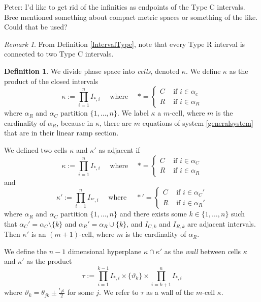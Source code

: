 \documentclass[12pt]{article}
\theoremstyle{definition}
\newtheorem{defn}{Definition}[section]
\theoremstyle{remark}
\newtheorem{remark}{Remark}[section]
\begin{document}
{\color{cyan} Peter: I'd like to get rid of the infinities as endpoints of the Type C intervals. Bree mentioned something about compact metric spaces or something of the like. Could that be used?}

\begin{remark}
From Definition \ref{IntervalType}, note that every Type R interval is connected to two Type C intervals.
\end{remark}

\begin{defn} \label{kappa}
 We divide phase space into \textit{cells}, denoted $\kappa$. We define $\kappa$ as the product of the closed intervals
 \begin{equation}	\label{kappadefn}
 \kappa:=\prod_{i=1}^n I_{*,i} \quad \text{ where } \quad *=
 \begin{cases} 
 C & \text { if } i\in\alpha_c \\
 R & \text{ if } i \in \alpha_R
 \end{cases}
 \end{equation}
 where $\alpha_R$ and $\alpha_C$ partition $\{1,\dots,n\}$. We label $\kappa$ a  $m$-cell, where $m$ is the cardinality of $\alpha_R$, because in $\kappa$, there are $m$ equations of system \eqref{generalsystem} that are in their linear ramp section.

We defined two cells $\kappa$ and $\kappa'$ as adjacent if 
\begin{equation*}
\kappa:=\prod_{i=1}^n I_{*,i} \quad \text{ where } \quad *=
 \begin{cases} 
 C & \text { if } i\in\alpha_C \\
 R & \text{ if } i \in \alpha_R
 \end{cases}
 \end{equation*}
 and 
 \begin{equation*}
\kappa':=\prod_{i=1}^n I_{*',i} \quad \text{ where } \quad *'=
 \begin{cases} 
 C & \text { if } i\in\alpha_C' \\
 R & \text{ if } i \in \alpha_R'
 \end{cases}
 \end{equation*}
 where $\alpha_R$ and $\alpha_C$ partition $\{1,\dots,n\}$ and there exists some $k\in \{1,\dots,n\}$ such that $\alpha_C'=\alpha_C\setminus \{k\}$ and $\alpha_R'=\alpha_R\cup \{k\}$, and $I_{C,k}$ and $I_{R,k}$ are adjacent intervals. Then $\kappa'$ is an $(m+1)$-cell, where $m$ is the cardinality of $\alpha_R$.
 
We define the $n-1$ dimensional hyperplane $\kappa \cap \kappa'$ as the \textit{wall} between cells $\kappa$ and $\kappa'$ as the product
\begin{equation*}
\tau:=\prod_{i=1}^{k-1} I_{*,i} \times \{\vartheta_k\} \times \prod_{i=k+1}^{n} I_{*,i}
\end{equation*}
where $\vartheta_k = \theta_{jk} \pm \frac{\epsilon_{jk}}{2}$ for some $j$. We refer to $\tau$ as a wall of the $m$-cell $\kappa$.
\end{defn}
\end{document}
